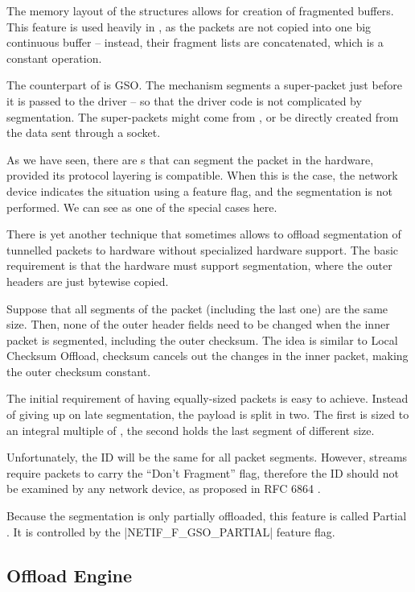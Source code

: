 The memory layout of the \skb{} structures allows for creation of fragmented
buffers. This feature is used heavily in , as the packets are not copied
into one big continuous buffer -- instead, their fragment lists are
concatenated, which is a constant operation.

The counterpart of  is \acrfull{GSO}. The  mechanism segments
a super-packet just before it is passed to the driver -- so that the driver
code is not complicated by segmentation. The super-packets might come from
, or be directly created from the data sent through a socket.

As we have seen, there are s that can segment the packet in the
hardware, provided its protocol layering is compatible. When this is the
case, the network device indicates the situation using a feature flag, and the
segmentation is not performed. We can see  as one of the special cases
here.

There is yet another technique that sometimes allows to offload segmentation
of tunnelled packets to hardware without specialized hardware support. The basic
requirement is that the hardware must support segmentation, where the outer
headers are just bytewise copied.

Suppose that all segments of the packet (including the last one) are the same size. Then,
none of the outer header fields need to be changed when the inner packet is
segmented, including the outer checksum. The idea is similar to Local Checksum
Offload, checksum cancels out the changes in the inner packet, making the outer
checksum constant.

The initial requirement of having equally-sized packets is easy to achieve.
Instead of giving up on late segmentation, the payload is split in two. The
first is sized to an integral multiple of , the second holds the last
segment of different size.

Unfortunately, the  ID will be the same for all packet segments.
However,  streams require  packets to carry the ``Don't
Fragment'' flag, therefore the ID should not be examined by any network device,
as proposed in RFC 6864 \cite{RFC6864}.

Because the segmentation is only partially offloaded, this feature is called
Partial . It is controlled by the \macro|NETIF_F_GSO_PARTIAL| feature flag.

\subsection{ Offload Engine}

